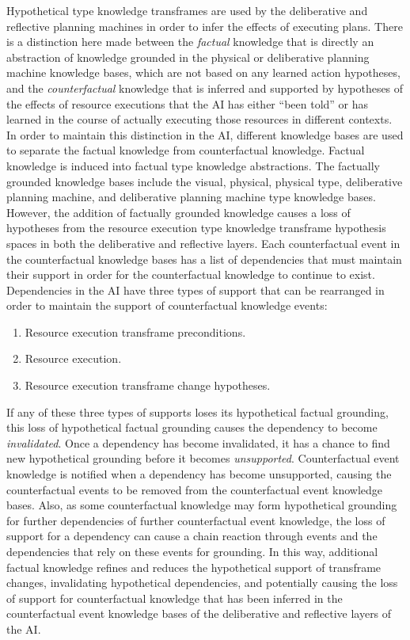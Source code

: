 Hypothetical type knowledge transframes are used by the deliberative
and reflective planning machines in order to infer the effects of
executing plans.  There is a distinction here made between the
\emph{factual} knowledge that is directly an abstraction of knowledge
grounded in the physical or deliberative planning machine knowledge
bases, which are not based on any learned action hypotheses, and the
\emph{counterfactual} knowledge that is inferred and supported by
hypotheses of the effects of resource executions that the AI has
either ``been told'' or has learned in the course of actually
executing those resources in different contexts.  In order to maintain
this distinction in the AI, different knowledge bases are used to
separate the factual knowledge from counterfactual knowledge.  Factual
knowledge is induced into factual type knowledge abstractions.  The
factually grounded knowledge bases include the visual, physical,
physical type, deliberative planning machine, and deliberative
planning machine type knowledge bases.  However, the addition of
factually grounded knowledge causes a loss of hypotheses from the
resource execution type knowledge transframe hypothesis spaces in both
the deliberative and reflective layers.  Each counterfactual event in
the counterfactual knowledge bases has a list of dependencies that
must maintain their support in order for the counterfactual knowledge
to continue to exist.  Dependencies in the AI have three types of
support that can be rearranged in order to maintain the support of
counterfactual knowledge events:
\begin{enumerate}
\item Resource execution transframe preconditions.
\item Resource execution.
\item Resource execution transframe change hypotheses.
\end{enumerate}
If any of these three types of supports loses its hypothetical factual
grounding, this loss of hypothetical factual grounding causes the
dependency to become \emph{invalidated}.  Once a dependency has become
invalidated, it has a chance to find new hypothetical grounding before
it becomes \emph{unsupported}.  Counterfactual event knowledge is
notified when a dependency has become unsupported, causing the
counterfactual events to be removed from the counterfactual event
knowledge bases.  Also, as some counterfactual knowledge may form
hypothetical grounding for further dependencies of further
counterfactual event knowledge, the loss of support for a dependency
can cause a chain reaction through events and the dependencies that
rely on these events for grounding.  In this way, additional factual
knowledge refines and reduces the hypothetical support of transframe
changes, invalidating hypothetical dependencies, and potentially
causing the loss of support for counterfactual knowledge that has been
inferred in the counterfactual event knowledge bases of the
deliberative and reflective layers of the AI.

